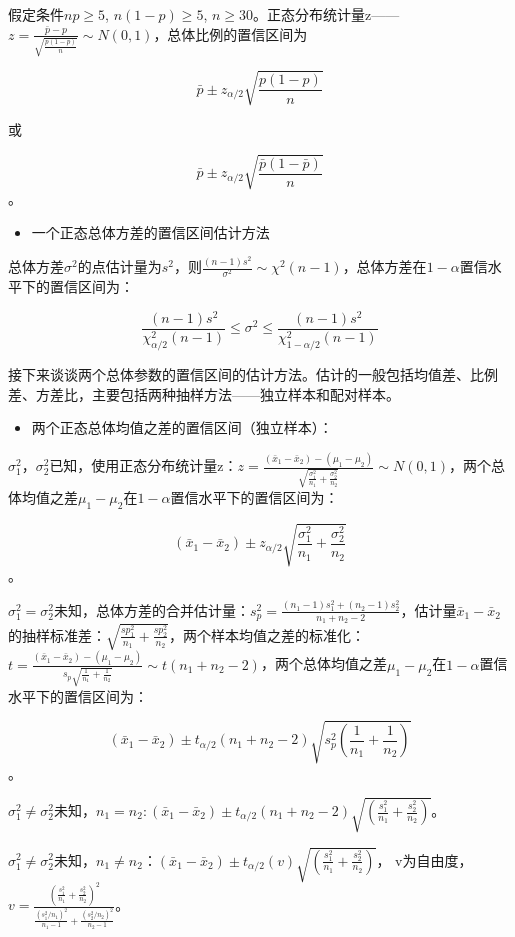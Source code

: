 \documentclass[]{ctexbook}
\providecommand{\tightlist}{%
  \setlength{\itemsep}{0pt}\setlength{\parskip}{0pt}}
\begin{document}
假定条件\(np\geq5\), \(n(1-p)\geq5\), \(n\geq30\)。正态分布统计量z------\(z=\frac{\bar p-p}{\sqrt{\frac{p(1-p)}{n}}}\sim N(0,1)\)，总体比例的置信区间为

\[\bar p\pm z_{\alpha/2}\sqrt{\frac{p(1-p)}{n}}\]

或

\[\bar p\pm z_{\alpha/2}\sqrt{\frac{\bar p(1-\bar p)}{n}}\]。

\begin{itemize}
\tightlist
\item
  一个正态总体方差的置信区间估计方法
\end{itemize}

总体方差\(\sigma^2\)的点估计量为\(s^2\)，则\(\frac{(n-1)s^2}{\sigma^2}\sim \chi^2(n-1)\)，总体方差在\(1-\alpha\)置信水平下的置信区间为：

\[\frac{(n-1)s^2}{\chi^2_{\alpha/2}(n-1)}\le \sigma^2 \le \frac{(n-1)s^2}{\chi^2_{1-\alpha/2}(n-1)}\]

接下来谈谈两个总体参数的置信区间的估计方法。估计的一般包括均值差、比例差、方差比，主要包括两种抽样方法------独立样本和配对样本。

\begin{itemize}
\tightlist
\item
  两个正态总体均值之差的置信区间（独立样本）：
\end{itemize}

\(\sigma_1^2\)，\(\sigma_2^2\)已知，使用正态分布统计量z：\(z=\frac{(\bar x_1-\bar x_2)-(\mu_1-\mu_2)}{\sqrt{\frac{\sigma_1^2}{n_1}+\frac{\sigma_2^2}{n_2}}}\sim N(0,1)\)，两个总体均值之差\(\mu_1-\mu_2\)在\(1-\alpha\)置信水平下的置信区间为：

\[(\bar x_1-\bar x_2)\pm z_{\alpha/2}\sqrt{\frac{\sigma_1^2}{n_1}+\frac{\sigma_2^2}{n_2}}\]。

\(\sigma_1^2=\sigma_2^2\)未知，总体方差的合并估计量：\(s_p^2=\frac{(n_1-1)s_1^2+(n_2-1)s_2^2}{n_1+n_2-2}\)，估计量\(\bar x_1-\bar x_2\)的抽样标准差：\(\sqrt{\frac{sp_1^2}{n_1}+\frac{sp_2^2}{n_2}}\)，两个样本均值之差的标准化：\(t=\frac{(\bar x_1-\bar x_2)-(\mu_1-\mu_2)}{s_p\sqrt{\frac{1}{n_1}+\frac{1}{n_2}}}\sim t(n_1+n_2-2)\)，两个总体均值之差\(\mu_1-\mu_2\)在\(1-\alpha\)置信水平下的置信区间为：

\[(\bar x_1-\bar x_2)\pm t_{\alpha/2}(n_1+n_2-2)\sqrt{s_p^2(\frac{1}{n_1}+\frac{1}{n_2})}\]。

\(\sigma_1^2\neq\sigma_2^2\)未知，\(n_1=n_2: (\bar x_1-\bar x_2)\pm t_{\alpha/2}(n_1+n_2-2)\sqrt{(\frac{s_1^2}{n_1}+\frac{s_2^2}{n_2})}\)。

\(\sigma_1^2\neq\sigma_2^2\)未知，\(n_1\neq n_2\)：\((\bar x_1-\bar x_2)\pm t_{\alpha/2}(v)\sqrt{(\frac{s_1^2}{n_1}+\frac{s_2^2}{n_2})}\)， v为自由度，\(v=\frac{(\frac{s_1^2}{n_1}+\frac{s_2^2}{n_2})^2}{\frac{(s_1^2/n_1)^2}{n_1-1}+\frac{(s_2^2/n_2)^2}{n_2-1}}\)。
\end{document}

